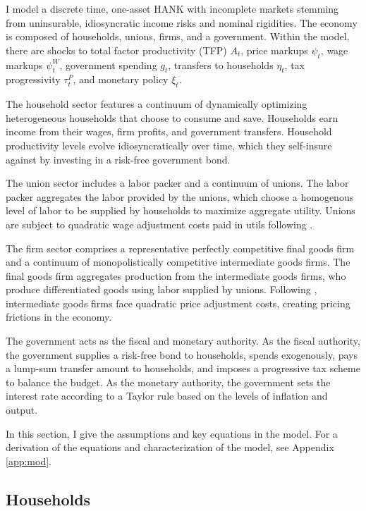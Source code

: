 I model a discrete time, one-asset HANK with incomplete markets stemming from uninsurable, idiosyncratic income risks and nominal rigidities. The economy is composed of households, unions, firms, and a government. Within the model, there are shocks to total factor productivity (TFP) $A_t$, price markups $\psi_t$, wage markups $\psi_t^W$, government spending $g_t$, transfers to households $\eta_t$, tax progressivity $\tau^P_t$, and monetary policy $\xi_t$.

The household sector features a continuum of dynamically optimizing heterogeneous households that choose to consume and save. Households earn income from their wages, firm profits, and government transfers. Household productivity levels evolve idiosyncratically over time, which they self-insure against by investing in a risk-free government bond.

The union sector includes a labor packer and a continuum of unions. The labor packer aggregates the labor provided by the unions, which choose a homogenous level of labor to be supplied by households to maximize aggregate utility. Unions are subject to quadratic wage adjustment costs paid in utils following \textcite{auclert2023mpcs}.

The firm sector comprises a representative perfectly competitive final goods firm and a continuum of monopolistically competitive intermediate goods firms. The final goods firm aggregates production from the intermediate goods firms, who produce differentiated goods using labor supplied by unions. Following \textcite{rotemberg1982sticky}, intermediate goods firms face quadratic price adjustment costs, creating pricing frictions in the economy.

The government acts as the fiscal and monetary authority. As the fiscal authority, the government supplies a risk-free bond to households, spends exogenously, pays a lump-sum transfer amount to households, and imposes a progressive tax scheme to balance the budget. As the monetary authority, the government sets the interest rate according to a Taylor rule based on the levels of inflation and output.

In this section, I give the assumptions and key equations in the model. For a derivation of the equations and characterization of the model, see Appendix \ref{app:mod}.


\subsection{Households} \label{subsec:hh}

